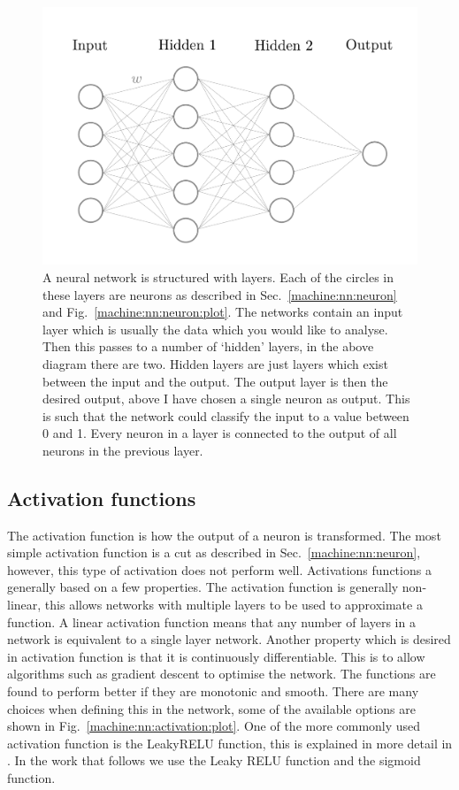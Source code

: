 \begin{figure}[h]
    \centering
    \includegraphics[width=\columnwidth]{C4_cnn/simple_network.pdf}
    \caption{A neural network is structured with layers. Each of the circles in these layers are neurons as described in Sec.~\ref{machine:nn:neuron} and Fig.~\ref{machine:nn:neuron:plot}. The networks contain an input layer which is usually the data which you would like to analyse. Then this passes to a number of `hidden' layers, in the above diagram there are two. Hidden layers are just layers which exist between the input and the output. The output layer is then the desired output, above I have chosen a single neuron as output. This is such that the network could classify the input to a value between 0 and 1. Every neuron in a layer is connected to the output of all neurons in the previous layer.}
    \label{machine:nn:structure:plot}
\end{figure}


\subsection{\label{machine:nn:activation}Activation functions}

The activation function is how the output of a neuron is transformed. 
The most simple activation function is a cut as described in Sec.~\ref{machine:nn:neuron}, however, this type of activation does not perform well.
Activations functions a generally based on a few properties.
The activation function is generally non-linear, this allows networks with multiple layers to be used to approximate a function. A linear activation function means that any number of layers in a network is equivalent to a single layer network.
Another property which is desired in activation function is that it is continuously differentiable. This is to allow algorithms such as gradient descent to optimise the network. 
The functions are found to perform better if they are monotonic and smooth.
There are many choices when defining this in the network, some of the available options are shown in Fig.~\ref{machine:nn:activation:plot}.
One of the more commonly used activation function is the LeakyRELU function, this is explained in more detail in \citep{maas2013RectifierNonlinearities}.
In the work that follows we use the Leaky RELU function and the sigmoid function.


